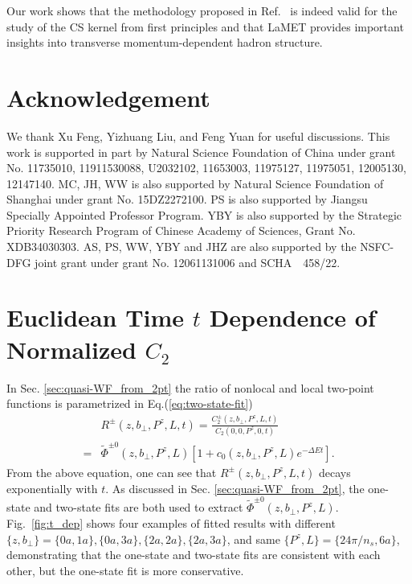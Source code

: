 \documentclass[prd,aps,twocolumn,preprintnumbers, showpacs, nofootinbib,superscriptaddress,notitlepage]{revtex4-1}
\newcommand\bl{\color{blue}}
\begin{document}
Our work shows that the methodology proposed in Ref.~\cite{Ji:2019sxk,Ji:2019ewn} is indeed valid for the study of {\bl the} CS kernel from  {\bl first principles and that LaMET provides important insights into transverse momentum-dependent hadron structure.} 


\section*{Acknowledgement}
We thank Xu Feng,   Yizhuang Liu,  and Feng Yuan for useful discussions.  This work is supported in part by Natural Science Foundation of China under grant No. 11735010, 11911530088, U2032102, 11653003, 11975127, 11975051, 12005130, 12147140. MC, JH, WW is also supported  by Natural Science Foundation of Shanghai under grant No. 15DZ2272100.  PS is also supported by Jiangsu Specially Appointed Professor Program. YBY is also supported by the Strategic Priority Research Program of Chinese Academy of Sciences, Grant No. XDB34030303. AS, PS, WW, YBY and JHZ are also supported by the NSFC-DFG joint grant under grant No. 12061131006 and SCHA~~458/22.









 

\appendix

\section{Euclidean Time $t$ Dependence of Normalized $C_2$}
\label{appsec:C2}


In Sec. \ref{sec:quasi-WF_from_2pt} the ratio of nonlocal and local  two-point {\bl functions is parametrized in} Eq.(\ref{eq:two-state-fit})
\begin{align}
&R^{\pm}\left(z,b_{\perp},P^z,L,t \right)=\frac{C_2^{\pm}\left(z,b_{\perp},P^z,L,t \right)}{C_2\left(0,0,P^z,0,t \right)} \nonumber\\
=&\tilde{\Phi}^{\pm0}\left(z,b_{\perp},P^z,L\right)\left[1+c_0\left(z,b_{\perp},P^z,L\right)e^{-\Delta Et} \right].
\end{align}
From the above equation,  one can see {\bl that} $R^{\pm}\left(z,b_{\perp},P^z,L,t \right)$ decays exponentially with $t$. As discussed in Sec. \ref{sec:quasi-WF_from_2pt}, the one-state and two-state fits are both used to extract $\tilde{\Phi}^{\pm0}\left(z,b_{\perp},P^z,L\right)$. Fig.~\ref{fig:t_dep} shows four examples of fitted results with different $\{z,b_{\perp}\}=\{0a,1a\},\{0a,3a\},\{2a,2a\},\{2a,3a\}$, and same $\{P^z,L\}=\{24\pi/n_s,6a\}$, demonstrating that the one-state and two-state fits are consistent with each other, but the one-state fit is more conservative.
\end{document}
